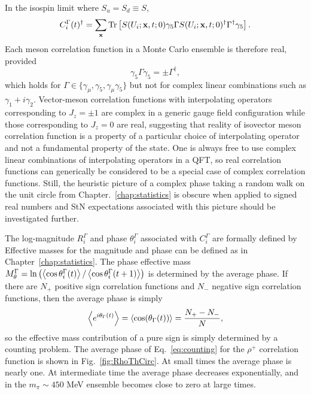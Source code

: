 In the isospin limit where $S_u = S_d \equiv S$,
\begin{equation}
  \begin{split}
    C_i^\Gamma(t)^\dagger = \sum_{\mathbf{x}} \text{Tr}\left[ S(U_i;\mathbf{x},t;0) \gamma_5 \Gamma S(U_i;\mathbf{x},t;0)^\dagger \Gamma^\dagger \gamma_5  \right].
  \end{split}\label{eq:reality}
\end{equation}
Each meson correlation function in a Monte Carlo ensemble is therefore real, provided
\begin{equation}
  \gamma_5 \Gamma \gamma_5 = \pm \Gamma^\dagger,
  \label{g5Hermmat}
\end{equation}
which holds for $\Gamma \in \{\gamma_\mu, \gamma_5, \gamma_\mu \gamma_5\}$ but not for complex linear combinations such as $\gamma_1 + i \gamma_2$. 
Vector-meson correlation functions with interpolating operators corresponding to $J_z = \pm1$ are complex in a generic gauge field configuration while those corresponding to $J_z = 0$ are real, suggesting that reality of isovector meson correlation function is a property of a particular choice of interpolating operator and not a fundamental property of the state. 
One is always free to use complex linear combinations of interpolating operators in a QFT, so real correlation functions can generically be considered to be a special case of complex correlation functions.
Still, the heuristic picture of a complex phase taking a random walk on the unit circle from Chapter.~\ref{chap:statistics} is obscure when applied to signed real numbers and StN expectations associated with this picture should be investigated further.


The log-magnitude $R^\Gamma_i$ and phase $\theta^\Gamma_i$ associated with $C_i^\Gamma$ are formally defined by
Effective masses for the magnitude and phase can be defined as in Chapter~\ref{chap:statistics}. 
The phase effective mass $M^\Gamma_\theta = \ln\left(\left< \cos \theta^\Gamma_i(t) \right>/\left< \cos \theta^\Gamma_i(t+1) \right>\right)$ is determined by the average phase.
If there are $N_+$ positive sign correlation functions and $N_-$ negative sign correlation functions, then the average phase is simply
\begin{equation}
  \begin{split}
    \left< e^{i\theta_\Gamma(t)} \right> = \left< \cos(\theta_\Gamma(t)) \right> = \frac{N_+ - N_-}{N},
  \end{split}\label{eq:counting}
\end{equation}
so the effective mass contribution of a pure sign is simply determined by a counting problem.
The average phase of Eq.~\eqref{eq:counting} for the $\rho^+$ correlation function is shown in Fig.~\ref{fig:RhoThCirc}.
At small times the average phase is nearly one.
At intermediate time the average phase decreases exponentially, and in the $m_\pi\sim 450$ MeV ensemble becomes close to zero at large times.


